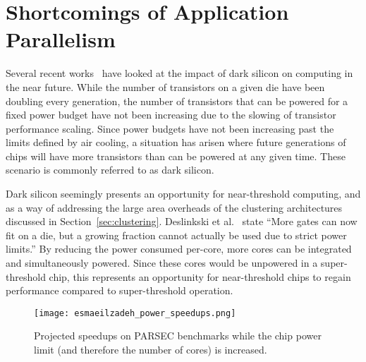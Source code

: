 \section{Shortcomings of Application Parallelism}
\label{sec:darksilicon}

Several recent works~\cite{Esmaeilzadeh2011Dark-silicon-an,Hardavellas:2011de}
have looked at the impact of dark silicon on computing in the near future. While
the number of transistors on a given die have been doubling every generation,
the number of transistors that can be powered for a fixed power budget have not
been increasing due to the slowing of transistor performance scaling. Since
power budgets have not been increasing past the limits defined by air cooling, a
situation has arisen where future generations of chips will have more
transistors than can be powered at any given time. These scenario is commonly
referred to as dark silicon.

Dark silicon seemingly presents an opportunity for near-threshold computing, and
as a way of addressing the large area overheads of the clustering architectures
discussed in Section~\ref{sec:clustering}.  Deslinkski et
al.~\cite{dreslinski2010near} state ``More gates can now fit on a die, but a
growing fraction cannot actually be used due to strict power limits.'' By
reducing the power consumed per-core, more cores can be integrated and
simultaneously powered. Since these cores would be unpowered in a
super-threshold chip, this represents an opportunity for near-threshold chips to
regain performance compared to super-threshold operation.

\begin{figure}[thpb]
    \centering
    \texttt{[image: esmaeilzadeh\_power\_speedups.png]}
    \caption{Projected speedups on PARSEC benchmarks while the chip power
limit (and therefore the number of cores) is increased.~\cite{Esmaeilzadeh2011Dark-silicon-an}}
    \label{fig:power_speedups}
\end{figure}

